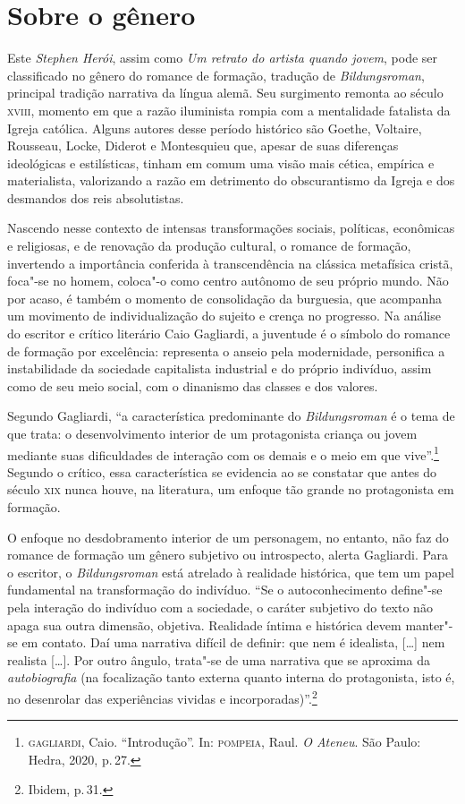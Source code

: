 \section{Sobre o gênero}

Este \textit{Stephen Herói}, assim como \textit{Um retrato do artista
quando jovem}, pode ser classificado no gênero do romance de formação, tradução
de \textit{Bildungsroman}, principal tradição narrativa da língua alemã.
Seu surgimento remonta ao século \textsc{xviii}, momento em que a razão iluminista
rompia com a mentalidade fatalista da Igreja católica.
Alguns autores desse período histórico são Goethe, Voltaire, Rousseau, Locke, Diderot e Montesquieu que, apesar de suas diferenças ideológicas e estilísticas, tinham em comum
uma visão mais cética, empírica e materialista, valorizando a razão em detrimento do obscurantismo da Igreja e dos desmandos dos reis absolutistas.

Nascendo nesse contexto de intensas transformações sociais, políticas, econômicas e religiosas, e de renovação da produção cultural, o romance de formação, invertendo a importância conferida à transcendência na clássica metafísica cristã, foca"-se no homem, coloca"-o como centro autônomo de seu próprio mundo. Não por acaso, é também o momento de consolidação da burguesia, que acompanha um movimento de individualização do sujeito e crença no progresso. Na análise do escritor e crítico literário Caio Gagliardi, a juventude é o símbolo do romance de formação por excelência: representa o anseio pela modernidade, personifica a instabilidade da sociedade capitalista industrial e do próprio indivíduo, assim como de seu meio social, com o dinanismo das classes e dos valores.

Segundo Gagliardi, ``a característica predominante do
\textit{Bildungsroman} é o tema de que
trata: o desenvolvimento interior de um protagonista criança ou jovem
mediante suas dificuldades de interação com os demais e o meio em que vive''.\footnote{\textsc{gagliardi}, Caio. ``Introdução''. In: \textsc{pompeia}, Raul. \textit{O Ateneu}. São Paulo: Hedra, 2020, p.\,27.} Segundo o crítico, essa característica se evidencia ao se constatar que antes do século \textsc{xix} nunca houve, na literatura, um enfoque tão grande no protagonista em formação.

O enfoque no desdobramento interior de um personagem, no entanto, não faz do romance de formação um gênero subjetivo ou introspecto, alerta Gagliardi. 
Para o escritor, o \textit{Bildungsroman} está atrelado à realidade histórica, que tem um papel fundamental na transformação do indivíduo. ``Se o autoconhecimento define"-se
pela interação do indivíduo com a sociedade, o caráter subjetivo do
texto não apaga sua outra dimensão, objetiva. Realidade íntima e
histórica devem manter"-se em contato. Daí uma narrativa difícil de
definir: que nem é idealista, [\ldots] nem realista [\ldots]. Por outro ângulo, trata"-se de uma narrativa que se aproxima da \textit{autobiografia} (na focalização tanto externa 
quanto interna do protagonista, isto é, no desenrolar das experiências vividas e incorporadas)''.\footnote{Ibidem, p.\,31.}

